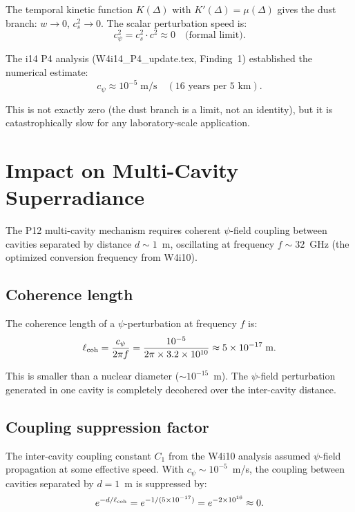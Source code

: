 \documentclass[11pt]{article}
\newcommand{\ee}[1]{\times 10^{#1}}
\begin{document}
The temporal kinetic function $K(\Delta)$ with $K'(\Delta) = \mu(\Delta)$
gives the dust branch: $w \to 0$, $c_s^2 \to 0$. The scalar
perturbation speed is:
\begin{equation}
c_\psi^2 = c_s^2 \cdot c^2 \approx 0 \quad \text{(formal limit)}.
\end{equation}

The i14 P4 analysis (W4i14\_P4\_update.tex, Finding~1) established the
numerical estimate:
\begin{equation}
c_\psi \approx 10^{-5}\;\text{m/s} \quad (\text{16 years per 5~km}).
\end{equation}

This is not exactly zero (the dust branch is a limit, not an identity),
but it is catastrophically slow for any laboratory-scale application.

\section{Impact on Multi-Cavity Superradiance}

The P12 multi-cavity mechanism requires coherent $\psi$-field coupling
between cavities separated by distance $d \sim 1$~m, oscillating at
frequency $f \sim 32$~GHz (the optimized conversion frequency from
W4i10).

\subsection{Coherence length}

The coherence length of a $\psi$-perturbation at frequency $f$ is:
\begin{equation}
\ell_{\rm coh} = \frac{c_\psi}{2\pi f}
= \frac{10^{-5}}{2\pi \times 3.2\ee{10}}
\approx 5\ee{-17}\;\text{m}.
\end{equation}

This is smaller than a nuclear diameter ($\sim 10^{-15}$~m). The
$\psi$-field perturbation generated in one cavity is completely
decohered over the inter-cavity distance.

\subsection{Coupling suppression factor}

The inter-cavity coupling constant $C_1$ from the W4i10 analysis
assumed $\psi$-field propagation at some effective speed. With
$c_\psi \sim 10^{-5}$~m/s, the coupling between cavities separated
by $d = 1$~m is suppressed by:
\begin{equation}
e^{-d/\ell_{\rm coh}} = e^{-1/(5\ee{-17})}
= e^{-2\ee{16}} \approx 0.
\end{equation}
\end{document}
